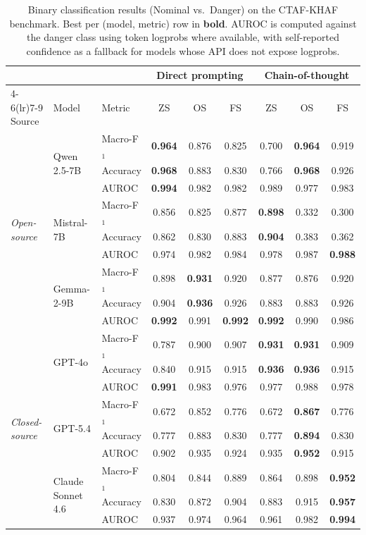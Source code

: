 \begin{table}[ht]
\centering
\caption{Binary classification results (Nominal vs.\ Danger) on the CTAF-KHAF benchmark. Best per (model, metric) row in \textbf{bold}. AUROC is computed against the danger class using token logprobs where available, with self-reported confidence as a fallback for models whose API does not expose logprobs.}
\label{tab:main_binary}
\renewcommand{\arraystretch}{1.10}
\small
\begin{tabular}{l l l *{6}{c}}
\toprule
 & & & \multicolumn{3}{c}{Direct prompting} & \multicolumn{3}{c}{Chain-of-thought} \\
\cmidrule(lr){4-6}\cmidrule(lr){7-9}
Source & Model & Metric & ZS & OS & FS & ZS & OS & FS \\
\midrule
  \multirow{9}{*}{\textit{Open-source}} & \multirow{3}{*}{Qwen 2.5-7B} & Macro-F$_1$ & \textbf{0.964} & 0.876 & 0.825 & 0.700 & \textbf{0.964} & 0.919 \\
   &  & Accuracy & \textbf{0.968} & 0.883 & 0.830 & 0.766 & \textbf{0.968} & 0.926 \\
   &  & AUROC & \textbf{0.994} & 0.982 & 0.982 & 0.989 & 0.977 & 0.983 \\
\cmidrule(lr){2-9}
   & \multirow{3}{*}{Mistral-7B} & Macro-F$_1$ & 0.856 & 0.825 & 0.877 & \textbf{0.898} & 0.332 & 0.300 \\
   &  & Accuracy & 0.862 & 0.830 & 0.883 & \textbf{0.904} & 0.383 & 0.362 \\
   &  & AUROC & 0.974 & 0.982 & 0.984 & 0.978 & 0.987 & \textbf{0.988} \\
\cmidrule(lr){2-9}
   & \multirow{3}{*}{Gemma-2-9B} & Macro-F$_1$ & 0.898 & \textbf{0.931} & 0.920 & 0.877 & 0.876 & 0.920 \\
   &  & Accuracy & 0.904 & \textbf{0.936} & 0.926 & 0.883 & 0.883 & 0.926 \\
   &  & AUROC & \textbf{0.992} & 0.991 & \textbf{0.992} & \textbf{0.992} & 0.990 & 0.986 \\
\midrule
  \multirow{9}{*}{\textit{Closed-source}} & \multirow{3}{*}{GPT-4o} & Macro-F$_1$ & 0.787 & 0.900 & 0.907 & \textbf{0.931} & \textbf{0.931} & 0.909 \\
   &  & Accuracy & 0.840 & 0.915 & 0.915 & \textbf{0.936} & \textbf{0.936} & 0.915 \\
   &  & AUROC & \textbf{0.991} & 0.983 & 0.976 & 0.977 & 0.988 & 0.978 \\
\cmidrule(lr){2-9}
   & \multirow{3}{*}{GPT-5.4} & Macro-F$_1$ & 0.672 & 0.852 & 0.776 & 0.672 & \textbf{0.867} & 0.776 \\
   &  & Accuracy & 0.777 & 0.883 & 0.830 & 0.777 & \textbf{0.894} & 0.830 \\
   &  & AUROC & 0.902 & 0.935 & 0.924 & 0.935 & \textbf{0.952} & 0.915 \\
\cmidrule(lr){2-9}
   & \multirow{3}{*}{Claude Sonnet 4.6} & Macro-F$_1$ & 0.804 & 0.844 & 0.889 & 0.864 & 0.898 & \textbf{0.952} \\
   &  & Accuracy & 0.830 & 0.872 & 0.904 & 0.883 & 0.915 & \textbf{0.957} \\
   &  & AUROC & 0.937 & 0.974 & 0.964 & 0.961 & 0.982 & \textbf{0.994} \\
\bottomrule
\end{tabular}
\end{table}